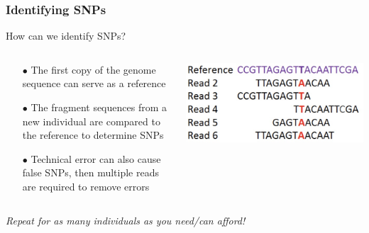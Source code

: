 \documentclass{beamer}
\begin{document}
\begin{frame}
	\frametitle{Identifying SNPs}

\centering How can we identify SNPs?\\

\vspace{20pt}

	\begin{columns}
	\begin{column}{0.5\textwidth}

		\begin{itemize}
			\item[$\bullet$] The first copy of the genome sequence can serve as a reference
			\item[$\bullet$] The fragment sequences from a new individual are compared to the reference to determine SNPs
			\item[$\bullet$] Technical error can also cause  false SNPs, then multiple reads are required to remove errors

		\end{itemize}
	\end{column}
	\begin{column}{0.5\textwidth}
		\includegraphics[keepaspectratio, width  = \textwidth]{img/readDiagram}
\end{column}
\end{columns}
\vspace{10pt}
\centering \textit{Repeat for as many individuals as you need/can afford!}
\end{frame}
\end{document}
